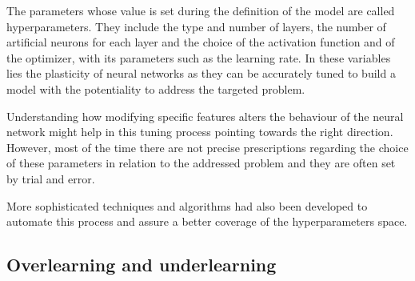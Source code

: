 \documentclass[a4paper,10pt]{report}
\begin{document}
The parameters whose value is set during the definition of the model are called hyperparameters.
They include the type and number of layers, the number of artificial neurons for each layer and
the choice of the activation function and of the optimizer, with
its parameters such as the learning rate. In these variables lies the plasticity of neural networks as
they can be accurately tuned to build a model with the potentiality 
to address the targeted problem.

Understanding how modifying specific features alters the behaviour of the neural 
network might help in this tuning process pointing towards the right direction.
However, most of the time there are not precise prescriptions regarding the choice of these parameters
in relation to the addressed problem and they are often set by trial and error.

More sophisticated techniques and algorithms had also been developed to automate this process and 
assure a better coverage of the hyperparameters space.

\subsection{Overlearning and underlearning}

\end{document}

